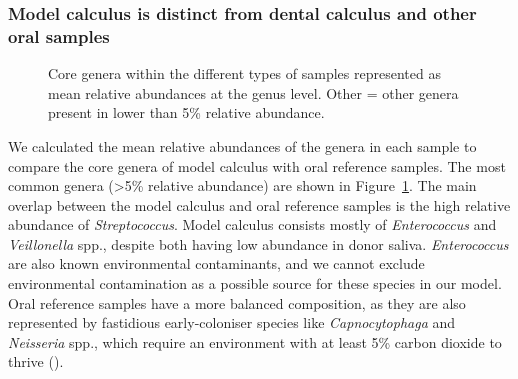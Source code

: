 \documentclass[
  b5paper,
]{book}
\begin{document}
\subsubsection{Model calculus is distinct from dental calculus and other
oral
samples}\label{model-calculus-is-distinct-from-dental-calculus-and-other-oral-samples}

\begin{figure}


\caption{\label{fig-core-genera}Core genera within the different types
of samples represented as mean relative abundances at the genus level.
Other = other genera present in lower than 5\% relative abundance.}

\end{figure}%

We calculated the mean relative abundances of the genera in each sample
to compare the core genera of model calculus with oral reference
samples. The most common genera (\textgreater5\% relative abundance) are
shown in Figure~\ref{fig-core-genera}. The main overlap between the
model calculus and oral reference samples is the high relative abundance
of \emph{Streptococcus}. Model calculus consists mostly of
\emph{Enterococcus} and \emph{Veillonella} spp., despite both having low
abundance in donor saliva. \emph{Enterococcus} are also known
environmental contaminants, and we cannot exclude environmental
contamination as a possible source for these species in our model. Oral
reference samples have a more balanced composition, as they are also
represented by fastidious early-coloniser species like
\emph{Capnocytophaga} and \emph{Neisseria} spp., which require an
environment with at least 5\% carbon dioxide to thrive
().
\end{document}
